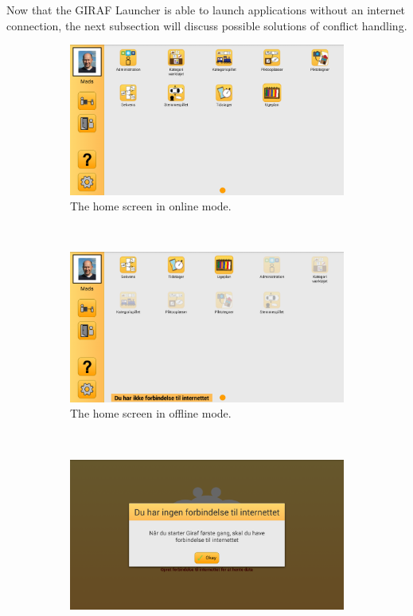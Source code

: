 Now that the GIRAF Launcher is able to launch applications without an internet connection, the next subsection will discuss possible solutions of conflict handling.

\begin{figure}[h!]
    \centering
    \begin{subfigure}[t]{0.47\textwidth}
        \includegraphics[width=\textwidth]{figures/img/screenshots/reg_homescreen.png}
        \caption{The home screen in online mode.}\label{fig:online_homescreen}
    \end{subfigure}%
    ~
    \begin{subfigure}[t]{0.47\textwidth}
        \includegraphics[width=\textwidth]{figures/img/screenshots/offline_homescreen.png}
        \caption{The home screen in offline mode.}\label{fig:offline_homescreen}
    \end{subfigure}
    \\
    \begin{subfigure}[t]{0.47\textwidth}
        \includegraphics[width=\textwidth]{figures/img/screenshots/offline_initstart.png}

\end{subfigure}
\end{figure}
